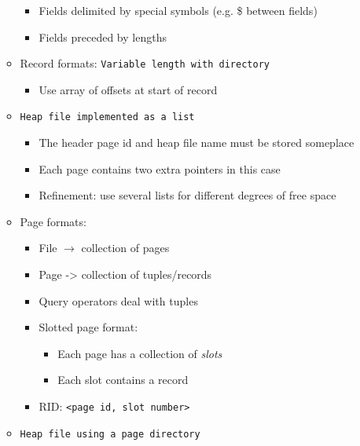 \documentclass[landscape,8pt]{extarticle}
\newcommand{\code}{\lstinline}
\begin{document}
\begin{multicols}{5}
\begin{itemize}
\begin{itemize}
\begin{itemize}
                            \item Fields delimited by special symbols (e.g. \$ between fields)
                            \item Fields preceded by lengths
                        \end{itemize}
                  \item  Record formats: \code{Variable length with directory}
                        \begin{itemize}
                            \item Use array of offsets at start of record
                        \end{itemize}
                  \item \code{Heap file implemented as a list}
                        \begin{itemize}
                            \item The header page id and heap file name must be stored someplace
                            \item Each page contains two extra pointers in this case
                            \item Refinement: use several lists for different degrees of free space
                        \end{itemize}
                  \item Page formats:
                        \begin{itemize}
                            \item File $\rightarrow$ collection of pages
                            \item Page -> collection of tuples/records
                            \item Query operators deal with tuples
                            \item Slotted page format:
                                  \begin{itemize}
                                      \item Each page has a collection of \emph{slots}
                                      \item Each slot contains a record
                                  \end{itemize}
                            \item RID: \code{<page id, slot number>}
                        \end{itemize}
                  \item \code{Heap file using a page directory}

\end{itemize}
\end{itemize}
\end{multicols}
\end{document}
